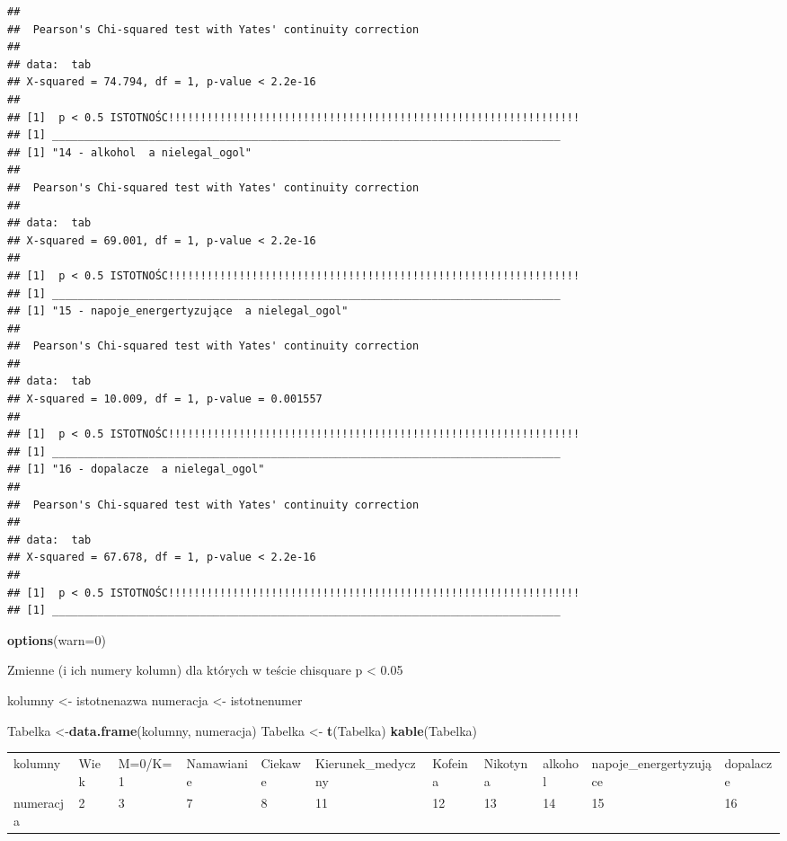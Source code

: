 \documentclass[]{article}
\newenvironment{Shaded}{\begin{snugshade}}{\end{snugshade}}
\newcommand{\KeywordTok}[1]{\textcolor[rgb]{0.13,0.29,0.53}{\textbf{#1}}}
\newcommand{\DataTypeTok}[1]{\textcolor[rgb]{0.13,0.29,0.53}{#1}}
\newcommand{\DecValTok}[1]{\textcolor[rgb]{0.00,0.00,0.81}{#1}}
\newcommand{\StringTok}[1]{\textcolor[rgb]{0.31,0.60,0.02}{#1}}
\newcommand{\NormalTok}[1]{#1}
\begin{document}
\begin{verbatim}
## 
##  Pearson's Chi-squared test with Yates' continuity correction
## 
## data:  tab
## X-squared = 74.794, df = 1, p-value < 2.2e-16
## 
## [1]  p < 0.5 ISTOTNOŚC!!!!!!!!!!!!!!!!!!!!!!!!!!!!!!!!!!!!!!!!!!!!!!!!!!!!!!!!!!!!!!!!
## [1] _______________________________________________________________________________
## [1] "14 - alkohol  a nielegal_ogol"
## 
##  Pearson's Chi-squared test with Yates' continuity correction
## 
## data:  tab
## X-squared = 69.001, df = 1, p-value < 2.2e-16
## 
## [1]  p < 0.5 ISTOTNOŚC!!!!!!!!!!!!!!!!!!!!!!!!!!!!!!!!!!!!!!!!!!!!!!!!!!!!!!!!!!!!!!!!
## [1] _______________________________________________________________________________
## [1] "15 - napoje_energertyzujące  a nielegal_ogol"
## 
##  Pearson's Chi-squared test with Yates' continuity correction
## 
## data:  tab
## X-squared = 10.009, df = 1, p-value = 0.001557
## 
## [1]  p < 0.5 ISTOTNOŚC!!!!!!!!!!!!!!!!!!!!!!!!!!!!!!!!!!!!!!!!!!!!!!!!!!!!!!!!!!!!!!!!
## [1] _______________________________________________________________________________
## [1] "16 - dopalacze  a nielegal_ogol"
## 
##  Pearson's Chi-squared test with Yates' continuity correction
## 
## data:  tab
## X-squared = 67.678, df = 1, p-value < 2.2e-16
## 
## [1]  p < 0.5 ISTOTNOŚC!!!!!!!!!!!!!!!!!!!!!!!!!!!!!!!!!!!!!!!!!!!!!!!!!!!!!!!!!!!!!!!!
## [1] _______________________________________________________________________________
\end{verbatim}

\begin{Shaded}
\begin{Highlighting}[]
\KeywordTok{options}\NormalTok{(}\DataTypeTok{warn=}\DecValTok{0}\NormalTok{)}
\end{Highlighting}
\end{Shaded}

Zmienne (i ich numery kolumn) dla których w teście chisquare p
\textless{} 0.05

\begin{Shaded}
\begin{Highlighting}[]
\NormalTok{kolumny <-}\StringTok{ }\NormalTok{istotnenazwa}
\NormalTok{numeracja <-}\StringTok{ }\NormalTok{istotnenumer}

\NormalTok{Tabelka <-}\KeywordTok{data.frame}\NormalTok{(kolumny, numeracja)}
\NormalTok{Tabelka <-}\StringTok{ }\KeywordTok{t}\NormalTok{(Tabelka)}
\KeywordTok{kable}\NormalTok{(Tabelka)}
\end{Highlighting}
\end{Shaded}

\begin{longtable}[]{@{}lllllllllll@{}}
\toprule
kolumny & Wiek & M=0/K=1 & Namawianie & Ciekawe & Kierunek\_medyczny &
Kofeina & Nikotyna & alkohol & napoje\_energertyzujące &
dopalacze\tabularnewline
numeracja & 2 & 3 & 7 & 8 & 11 & 12 & 13 & 14 & 15 & 16\tabularnewline
\bottomrule
\end{longtable}
\end{document}
